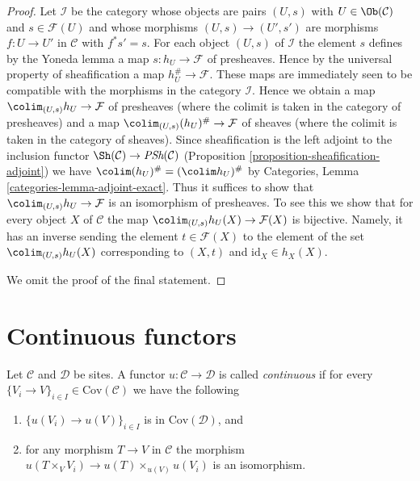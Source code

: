 \begin{proof}
Let $\mathcal{I}$ be the category whose objects are pairs
$(U, s)$ with $U \in \Ob(\mathcal{C})$ and $s \in \mathcal{F}(U)$
and whose morphisms $(U, s) \to (U', s')$ are morphisms $f : U \to U'$
in $\mathcal{C}$ with $f^*s' = s$. For each object $(U, s)$ of $\mathcal{I}$
the element $s$ defines by the Yoneda lemma a map $s : h_U \to \mathcal{F}$
of presheaves. Hence by the universal property of sheafification a map
$h_U^\# \to \mathcal{F}$. These maps are immediately seen to be compatible
with the morphisms in the category $\mathcal{I}$. Hence we obtain
a map $\colim_{(U, s)} h_U \to \mathcal{F}$ of presheaves (where the
colimit is taken in the category of presheaves) and a map
$\colim_{(U, s)} (h_U)^\# \to \mathcal{F}$ of sheaves (where the
colimit is taken in the category of sheaves).
Since sheafification is the left adjoint to the inclusion functor
$\Sh(\mathcal{C}) \to \textit{PSh}(\mathcal{C})$
(Proposition \ref{proposition-sheafification-adjoint}) we have
$\colim (h_U)^\# = (\colim h_U)^\#$ by
Categories, Lemma \ref{categories-lemma-adjoint-exact}.
Thus it suffices to show that $\colim_{(U, s)} h_U \to \mathcal{F}$
is an isomorphism of presheaves. To see this we show that for every object
$X$ of $\mathcal{C}$ the map $\colim_{(U, s)} h_U(X) \to \mathcal{F}(X)$
is bijective. Namely, it has an inverse sending the element
$t \in \mathcal{F}(X)$ to the element of the set $\colim_{(U, s)} h_U(X)$
corresponding to $(X, t)$ and $\text{id}_X \in h_X(X)$.

\medskip\noindent
We omit the proof of the final statement.
\end{proof}




\section{Continuous functors}
\label{section-continuous-functors}

\begin{definition}
\label{definition-continuous}
Let $\mathcal{C}$ and $\mathcal{D}$ be sites.
A functor $u : \mathcal{C} \to \mathcal{D}$ is called
{\it continuous} if for every
$\{V_i \to V\}_{i\in I} \in \text{Cov}(\mathcal{C})$
we have the following
\begin{enumerate}
\item $\{u(V_i) \to u(V)\}_{i\in I}$ is in $\text{Cov}(\mathcal{D})$, and
\item for any morphism $T \to V$ in $\mathcal{C}$ the morphism
$u(T \times_V V_i) \to u(T) \times_{u(V)} u(V_i)$ is an isomorphism.
\end{enumerate}
\end{definition}

